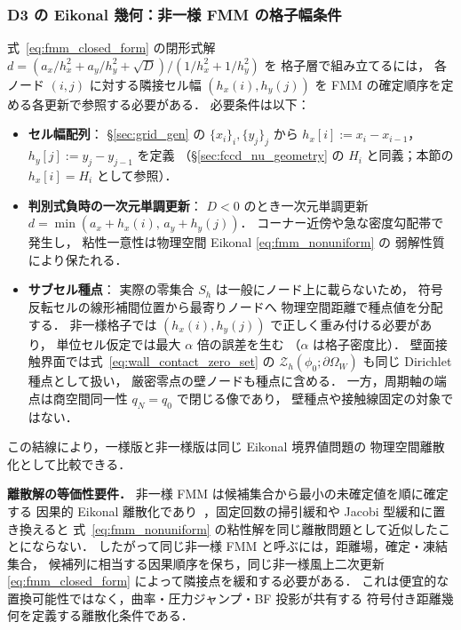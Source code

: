 \subsubsection{D3 の Eikonal 幾何：非一様 FMM の格子幅条件}
\label{sec:ridge_nu_fmm_geometry}

式~\eqref{eq:fmm_closed_form} の閉形式解
$d = (a_x/h_x^2 + a_y/h_y^2 + \sqrt{D})/(1/h_x^2 + 1/h_y^2)$ を
格子層で組み立てるには，
各ノード $(i,j)$ に対する隣接セル幅 $(h_x(i), h_y(j))$ を
FMM の確定順序を定める各更新で参照する必要がある．
必要条件は以下：
\begin{itemize}
  \item \textbf{セル幅配列}：
        \S\ref{sec:grid_gen} の $\{x_i\}_i, \{y_j\}_j$ から
        $h_x[i] := x_i - x_{i-1}$，$h_y[j] := y_j - y_{j-1}$ を定義
        （\S\ref{sec:fccd_nu_geometry} の $H_i$ と同義；本節の $h_x[i] = H_i$ として参照）．
  \item \textbf{判別式負時の一次元単調更新}：
        $D<0$ のとき一次元単調更新
        $d = \min(a_x + h_x(i),\,a_y + h_y(j))$．
        コーナー近傍や急な密度勾配帯で発生し，
        粘性一意性は物理空間 Eikonal \eqref{eq:fmm_nonuniform} の
        弱解性質により保たれる．
  \item \textbf{サブセル種点}：
        実際の零集合 $S_h$ は一般にノード上に載らないため，
        符号反転セルの線形補間位置から最寄りノードへ
        物理空間距離で種点値を分配する．
        非一様格子では $(h_x(i),h_y(j))$ で正しく重み付ける必要があり，
        単位セル仮定では最大 $\alpha$ 倍の誤差を生む
        （$\alpha$ は格子密度比）．
        壁面接触界面では式~\eqref{eq:wall_contact_zero_set} の
        $\mathcal{Z}_h(\phi_0;\partial\Omega_W)$ も同じ Dirichlet 種点として扱い，
        厳密零点の壁ノードも種点に含める．
        一方，周期軸の端点は商空間同一性 $q_N=q_0$ で閉じる像であり，
        壁種点や接触線固定の対象ではない．
\end{itemize}

\noindent この結線により，一様版と非一様版は同じ Eikonal 境界値問題の
物理空間離散化として比較できる．

\noindent\textbf{離散解の等価性要件．}
非一様 FMM は候補集合から最小の未確定値を順に確定する
因果的 Eikonal 離散化であり~\cite{Sethian1996}，固定回数の掃引緩和や Jacobi 型緩和に置き換えると
式~\eqref{eq:fmm_nonuniform} の粘性解を同じ離散問題として近似したことにならない．
したがって同じ非一様 FMM と呼ぶには，距離場，確定・凍結集合，
候補列に相当する因果順序を保ち，同じ非一様風上二次更新
\eqref{eq:fmm_closed_form} によって隣接点を緩和する必要がある．
これは便宜的な置換可能性ではなく，曲率・圧力ジャンプ・BF 投影が共有する
符号付き距離幾何を定義する離散化条件である．


